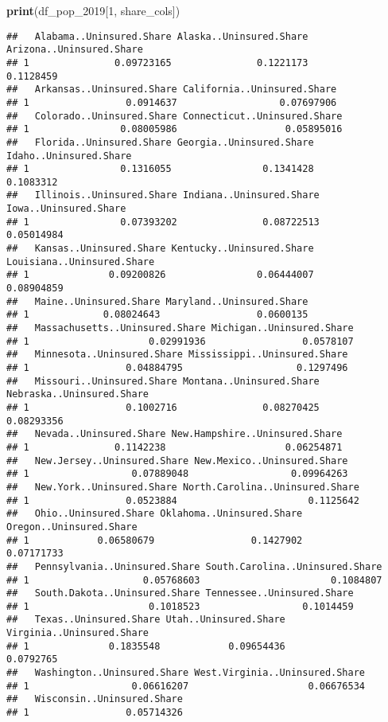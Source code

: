 \documentclass[
]{article}
\newenvironment{Shaded}{\begin{snugshade}}{\end{snugshade}}
\newcommand{\DecValTok}[1]{\textcolor[rgb]{0.00,0.00,0.81}{#1}}
\newcommand{\FunctionTok}[1]{\textcolor[rgb]{0.13,0.29,0.53}{\textbf{#1}}}
\newcommand{\NormalTok}[1]{#1}
\begin{document}
\begin{Shaded}
\begin{Highlighting}[]
\FunctionTok{print}\NormalTok{(df\_pop\_2019[}\DecValTok{1}\NormalTok{, share\_cols])}
\end{Highlighting}
\end{Shaded}

\begin{verbatim}
##   Alabama..Uninsured.Share Alaska..Uninsured.Share Arizona..Uninsured.Share
## 1               0.09723165               0.1221173                0.1128459
##   Arkansas..Uninsured.Share California..Uninsured.Share
## 1                 0.0914637                  0.07697906
##   Colorado..Uninsured.Share Connecticut..Uninsured.Share
## 1                0.08005986                   0.05895016
##   Florida..Uninsured.Share Georgia..Uninsured.Share Idaho..Uninsured.Share
## 1                0.1316055                0.1341428              0.1083312
##   Illinois..Uninsured.Share Indiana..Uninsured.Share Iowa..Uninsured.Share
## 1                0.07393202               0.08722513            0.05014984
##   Kansas..Uninsured.Share Kentucky..Uninsured.Share Louisiana..Uninsured.Share
## 1              0.09200826                0.06444007                 0.08904859
##   Maine..Uninsured.Share Maryland..Uninsured.Share
## 1             0.08024643                 0.0600135
##   Massachusetts..Uninsured.Share Michigan..Uninsured.Share
## 1                     0.02991936                 0.0578107
##   Minnesota..Uninsured.Share Mississippi..Uninsured.Share
## 1                 0.04884795                    0.1297496
##   Missouri..Uninsured.Share Montana..Uninsured.Share Nebraska..Uninsured.Share
## 1                 0.1002716               0.08270425                0.08293356
##   Nevada..Uninsured.Share New.Hampshire..Uninsured.Share
## 1               0.1142238                     0.06254871
##   New.Jersey..Uninsured.Share New.Mexico..Uninsured.Share
## 1                  0.07889048                  0.09964263
##   New.York..Uninsured.Share North.Carolina..Uninsured.Share
## 1                 0.0523884                       0.1125642
##   Ohio..Uninsured.Share Oklahoma..Uninsured.Share Oregon..Uninsured.Share
## 1            0.06580679                 0.1427902              0.07171733
##   Pennsylvania..Uninsured.Share South.Carolina..Uninsured.Share
## 1                    0.05768603                       0.1084807
##   South.Dakota..Uninsured.Share Tennessee..Uninsured.Share
## 1                     0.1018523                  0.1014459
##   Texas..Uninsured.Share Utah..Uninsured.Share Virginia..Uninsured.Share
## 1              0.1835548            0.09654436                 0.0792765
##   Washington..Uninsured.Share West.Virginia..Uninsured.Share
## 1                  0.06616207                     0.06676534
##   Wisconsin..Uninsured.Share
## 1                 0.05714326
\end{verbatim}
\end{document}
